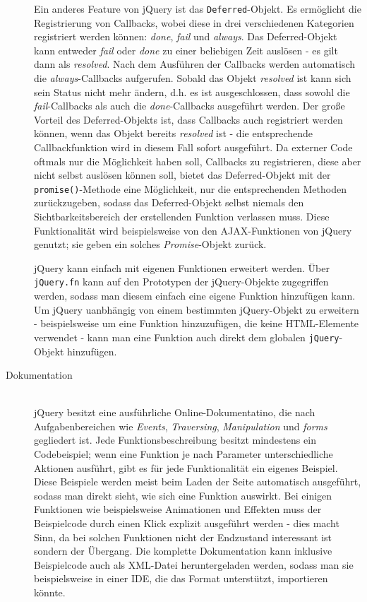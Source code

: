 \begin{description}
Ein anderes Feature von jQuery ist das \lstinline{Deferred}-Objekt. Es ermöglicht die Registrierung
von Callbacks, wobei diese in drei verschiedenen Kategorien registriert werden können: \emph{done},
\emph{fail} und \emph{always}. Das Deferred-Objekt kann entweder \emph{fail} oder \emph{done} zu
einer beliebigen Zeit auslösen - es gilt dann als \emph{resolved}. Nach dem Ausführen der Callbacks
werden automatisch die \emph{always}-Callbacks aufgerufen. Sobald das Objekt \emph{resolved} ist
kann sich sein Status nicht mehr ändern, d.h. es ist ausgeschlossen, dass sowohl die
\emph{fail}-Callbacks als auch die \emph{done}-Callbacks ausgeführt werden. Der große Vorteil des
Deferred-Objekts ist, dass Callbacks auch registriert werden können, wenn das Objekt bereits
\emph{resolved} ist - die entsprechende Callbackfunktion wird in diesem Fall sofort ausgeführt.
Da externer Code oftmals nur die Möglichkeit haben soll, Callbacks zu registrieren, diese aber nicht
selbst auslösen können soll, bietet das Deferred-Objekt mit der \lstinline{promise()}-Methode eine
Möglichkeit, nur die entsprechenden Methoden zurückzugeben, sodass das Deferred-Objekt selbst
niemals den Sichtbarkeitsbereich der erstellenden Funktion verlassen muss. Diese Funktionalität wird
beispielsweise von den AJAX-Funktionen von jQuery genutzt; sie geben ein solches
\emph{Promise}-Objekt zurück.

jQuery kann einfach mit eigenen Funktionen erweitert werden. Über \lstinline{jQuery.fn} kann auf den
Prototypen der jQuery-Objekte zugegriffen werden, sodass man diesem einfach eine eigene Funktion
hinzufügen kann. Um jQuery uanbhängig von einem bestimmten jQuery-Objekt zu erweitern -
beispielsweise um eine Funktion hinzuzufügen, die keine HTML-Elemente verwendet - kann man eine
Funktion auch direkt dem globalen \lstinline{jQuery}-Objekt hinzufügen.

\item[Dokumentation] \hfill \\
jQuery besitzt eine ausführliche Online-Dokumentatino, die nach Aufgabenbereichen wie
\emph{Events}, \emph{Traversing}, \emph{Manipulation} und \emph{forms} gegliedert ist. Jede
Funktionsbeschreibung besitzt mindestens ein Codebeispiel; wenn eine Funktion je nach Parameter
unterschiedliche Aktionen ausführt, gibt es für jede Funktionalität ein eigenes Beispiel. Diese
Beispiele werden meist beim Laden der Seite automatisch ausgeführt, sodass man direkt sieht, wie
sich eine Funktion auswirkt. Bei einigen Funktionen wie beispielsweise Animationen und Effekten muss
der Beispielcode durch einen Klick explizit ausgeführt werden - dies macht Sinn, da bei solchen
Funktionen nicht der Endzustand interessant ist sondern der Übergang. Die komplette Dokumentation
kann inklusive Beispielcode auch als XML-Datei heruntergeladen werden, sodass man sie beispielsweise
in einer IDE, die das Format unterstützt, importieren könnte.


\end{description}
